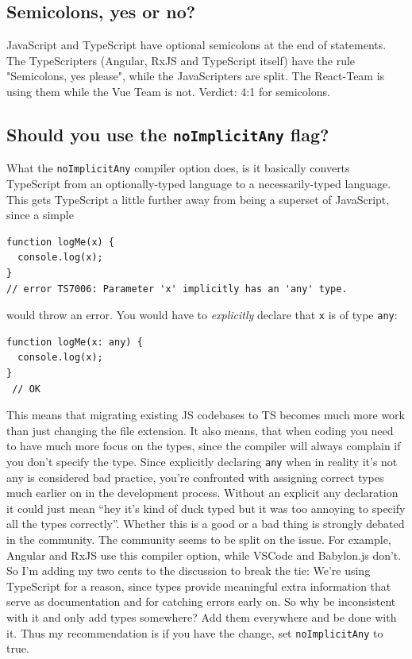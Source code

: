 \documentclass[12pt,a4paper]{report}
\begin{document}
\subsection{Semicolons, yes or no?}
JavaScript and TypeScript have optional semicolons at the end of statements. The TypeScripters (Angular, RxJS and TypeScript itself) have the rule "Semicolons, yes please", while the JavaScripters are split. The React-Team is using them while the Vue Team is not. Verdict: 4:1 for semicolons.

\subsection{Should you use the \texttt{noImplicitAny} flag?}
What the \texttt{noImplicitAny} compiler option does, is it basically converts TypeScript from an optionally-typed language to a necessarily-typed language. This gets TypeScript a little further away from being a superset of JavaScript, since a simple 
\begin{lstlisting}
function logMe(x) {
  console.log(x);
}
// error TS7006: Parameter 'x' implicitly has an 'any' type.
\end{lstlisting}
would throw an error. You would have to \textit{explicitly} declare that \texttt{x} is of type \texttt{any}:
\begin{lstlisting}
function logMe(x: any) {
  console.log(x);
}
 // OK
\end{lstlisting}

This means that migrating existing JS codebases to TS becomes much more work than just changing the file extension. It also means, that when coding you need to have much more focus on the types, since the compiler will always complain if you don't specify the type. Since explicitly declaring \texttt{any} when in reality it's not any is considered bad practice, you're confronted with assigning correct types much earlier on in the development process. Without an explicit any declaration it could just mean ``hey it's kind of duck typed but it was too annoying to specify all the types correctly''. Whether this is a good or a bad thing is strongly debated in the community. The community seems to be split on the issue. For example, Angular and RxJS use this compiler option, while VSCode and Babylon.js don't. So I'm adding my two cents to the discussion to break the tie: We're using TypeScript for a reason, since types provide meaningful extra information that serve as documentation and for catching errors early on. So why be inconsistent with it and only add types somewhere? Add them everywhere and be done with it. Thus my recommendation is if you have the change, set \texttt{noImplicitAny} to true.
\end{document}
